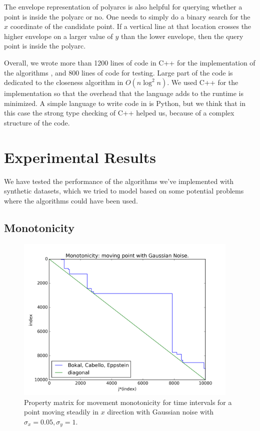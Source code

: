 \documentclass{article}
\begin{document}
The envelope representation of polyarcs is also helpful for querying
whether a point is inside the polyarc or no. One needs to simply
do a binary search for the $x$ coordinate of the candidate point.
If a vertical line at that location crosses the higher envelope on
a larger value of $y$ than the lower envelope, then the query point
is inside the polyarc.

Overall, we wrote more than 1200 lines of code in C++ for the
implementation of the algorithms \cite{report_code}, and 800 lines
of code for testing. Large part of the code is dedicated to the
closeness algorithm in $O(n \log^2 n)$. We used C++ for the
implementation so that the overhead that the language adds to the
runtime is minimized. A simple language to write code in is Python,
but we think that in this case the strong type checking of C++
helped us, because of a complex structure of the code.

\section{Experimental Results}
\label{sec:experiments}
We have tested the performance of the algorithms we've implemented
with synthetic datasets, which we tried to model based on some
potential problems where the algorithms could have been used.

\subsection{Monotonicity}
\label{sec:experiments:monotonicity}

\begin{figure}[!ht]
  \centering
  \includegraphics[height=8cm]{../plots/monotonicity_moving_gaussian}
  \caption{Property matrix for movement monotonicity for time intervals for a point moving steadily in $x$ direction with Gaussian noise with $\sigma_x = 0.05, \sigma_y = 1$.}
  \label{fig:monotonicity_demo}
\end{figure}
\end{document}
